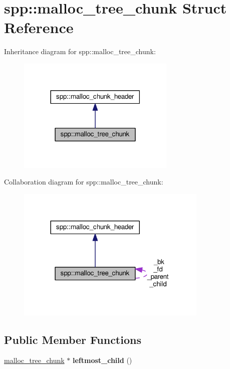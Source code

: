 \hypertarget{structspp_1_1malloc__tree__chunk}{}\section{spp\+:\+:malloc\+\_\+tree\+\_\+chunk Struct Reference}
\label{structspp_1_1malloc__tree__chunk}


Inheritance diagram for spp\+:\+:malloc\+\_\+tree\+\_\+chunk\+:\nopagebreak
\begin{figure}[H]
\begin{center}
\leavevmode
\includegraphics[width=213pt]{structspp_1_1malloc__tree__chunk__inherit__graph}
\end{center}
\end{figure}


Collaboration diagram for spp\+:\+:malloc\+\_\+tree\+\_\+chunk\+:\nopagebreak
\begin{figure}[H]
\begin{center}
\leavevmode
\includegraphics[width=258pt]{structspp_1_1malloc__tree__chunk__coll__graph}
\end{center}
\end{figure}
\subsection*{Public Member Functions}
\begin{DoxyCompactItemize}
\item 
\hyperlink{structspp_1_1malloc__tree__chunk}{malloc\+\_\+tree\+\_\+chunk} $\ast$ {\bfseries leftmost\+\_\+child} ()\hypertarget{structspp_1_1malloc__tree__chunk_a199d46c9d4859dcf88ef088805f806c7}{}\label{structspp_1_1malloc__tree__chunk_a199d46c9d4859dcf88ef088805f806c7}

\end{DoxyCompactItemize}

